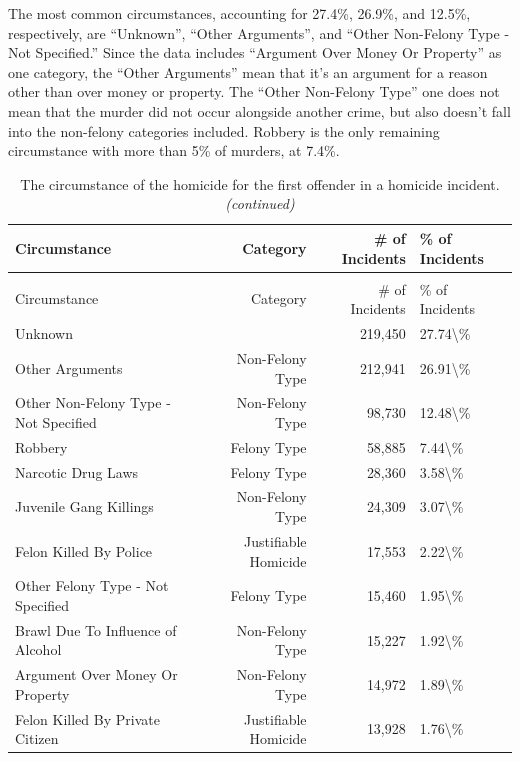 \documentclass[
]{krantz}
\begin{document}
The most common circumstances, accounting for 27.4\%,
26.9\%, and 12.5\%, respectively, are ``Unknown'', ``Other
Arguments'', and ``Other Non-Felony Type - Not Specified.''
Since the data includes ``Argument Over Money Or Property''
as one category, the ``Other Arguments'' mean that it's an
argument for a reason other than over money or property. The
``Other Non-Felony Type'' one does not mean that the murder
did not occur alongside another crime, but also doesn't fall
into the non-felony categories included. Robbery is the only
remaining circumstance with more than 5\% of murders, at
7.4\%.

\begin{longtable}[t]{l|r|r|l}
\caption{\label{tab:shrCircumstance}The circumstance of the homicide for the first offender in a homicide incident.}\\
\hline
Circumstance & Category & \# of Incidents & \% of Incidents\\
\hline
\endfirsthead
\caption[]{\label{tab:shrCircumstance}The circumstance of the homicide for the first offender in a homicide incident. \textit{(continued)}}\\
\hline
Circumstance & Category & \# of Incidents & \% of Incidents\\
\hline
\endhead
Unknown &  & 219,450 & 27.74\textbackslash{}\%\\
\hline
Other Arguments & Non-Felony Type & 212,941 & 26.91\textbackslash{}\%\\
\hline
Other Non-Felony Type - Not Specified & Non-Felony Type & 98,730 & 12.48\textbackslash{}\%\\
\hline
Robbery & Felony Type & 58,885 & 7.44\textbackslash{}\%\\
\hline
Narcotic Drug Laws & Felony Type & 28,360 & 3.58\textbackslash{}\%\\
\hline
Juvenile Gang Killings & Non-Felony Type & 24,309 & 3.07\textbackslash{}\%\\
\hline
Felon Killed By Police & Justifiable Homicide & 17,553 & 2.22\textbackslash{}\%\\
\hline
Other Felony Type - Not Specified & Felony Type & 15,460 & 1.95\textbackslash{}\%\\
\hline
Brawl Due To Influence of Alcohol & Non-Felony Type & 15,227 & 1.92\textbackslash{}\%\\
\hline
Argument Over Money Or Property & Non-Felony Type & 14,972 & 1.89\textbackslash{}\%\\
\hline
Felon Killed By Private Citizen & Justifiable Homicide & 13,928 & 1.76\textbackslash{}\%\\

\end{longtable}
\end{document}
